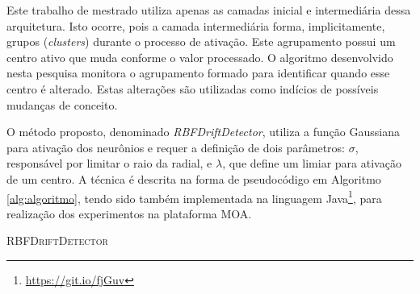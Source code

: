 \documentclass[msc, classic, a4paper]{ufbathesis}
\begin{document}
Este trabalho de mestrado utiliza apenas as camadas inicial e intermediária dessa arquitetura.
Isto ocorre, pois a camada intermediária forma, implicitamente, grupos (\textit{clusters}) durante o processo de ativação.
Este agrupamento possui um centro ativo que muda conforme o valor processado.
O algoritmo desenvolvido nesta pesquisa monitora o agrupamento formado para identificar quando esse centro é alterado.
Estas alterações são utilizadas como indícios de possíveis mudanças de conceito.

O método proposto, denominado \textit{RBFDriftDetector}, utiliza a função Gaussiana para ativação dos neurônios e requer a definição de dois parâmetros:
\textit{$\sigma$}, responsável por limitar o raio da radial, e \textit{$\lambda$}, que define um limiar para ativação de um centro.
A técnica é descrita na forma de pseudocódigo em Algoritmo \ref{alg:algoritmo},
tendo sido também implementada na linguagem Java\footnote{\url{https://git.io/fjGuv}}, para realização dos experimentos na plataforma MOA.

\vspace{7pt}
\begin{algorithm}[H]
    \SetAlgoLined

    \caption{\textsc{RBFDriftDetector}}
    \label{alg:algoritmo}
\end{algorithm}
\vspace{7pt}
\end{document}
